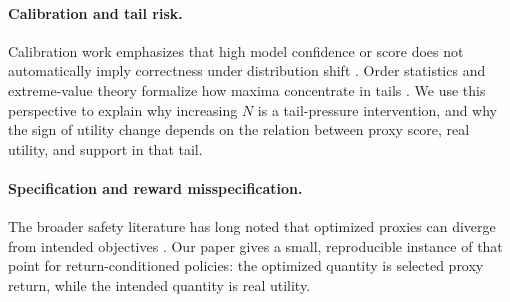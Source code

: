 \paragraph{Calibration and tail risk.}
Calibration work emphasizes that high model confidence or score does not automatically imply correctness under distribution shift \citep{guo2017calibration}. Order statistics and extreme-value theory formalize how maxima concentrate in tails \citep{david2003order,coles2001extreme}. We use this perspective to explain why increasing $N$ is a tail-pressure intervention, and why the sign of utility change depends on the relation between proxy score, real utility, and support in that tail.

\paragraph{Specification and reward misspecification.}
The broader safety literature has long noted that optimized proxies can diverge from intended objectives \citep{amodei2016safety}. Our paper gives a small, reproducible instance of that point for return-conditioned policies: the optimized quantity is selected proxy return, while the intended quantity is real utility.
